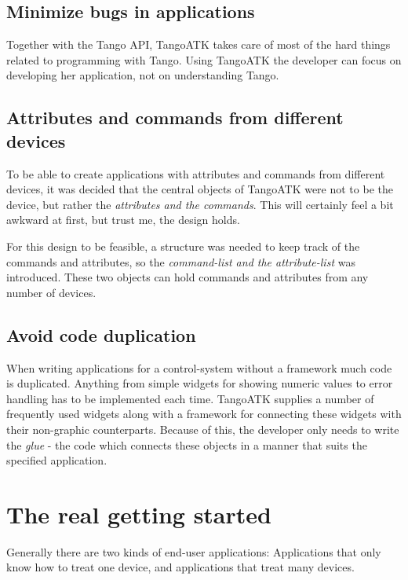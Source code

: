 \subsection{Minimize bugs in applications}

Together with the Tango API, TangoATK takes care of most of the hard
things related to programming with Tango. Using TangoATK the developer
can focus on developing her application, not on understanding Tango.

\subsection{Attributes and commands from different devices}

To be able to create applications with attributes
and commands from different devices, it was decided
that the central objects of TangoATK were not to be the device,
but rather the \emph{attributes and the commands}. This will certainly
feel a bit awkward at first, but trust me, the design holds.

For this design to be feasible, a structure was needed to keep track
of the commands and attributes, so the \emph{command-list
and the attribute-list} was introduced. These
two objects can hold commands and attributes from any number of devices.

\subsection{Avoid code duplication}

When writing applications for a control-system without a framework
much code is duplicated. Anything from simple widgets for showing
numeric values to error handling has to be implemented each time.
TangoATK supplies a number of frequently used widgets along with a
framework for connecting these widgets with their non-graphic counterparts.
Because of this, the developer only needs to write the \emph{glue}
- the code which connects these objects in a manner that suits the
specified application.

\section{The real getting started}

Generally there are two kinds of end-user applications: Applications
that only know how to treat one device, and applications that treat
many devices.


